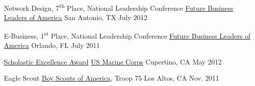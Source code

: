 \begin{cvhonors}
	
	\cvhonor
		{Network Design, 7\textsuperscript{th} Place, National Leadership Conference} %
		{\href{http://www.fbla-pbl.org/conferences/nlc/}{Future Business Leaders of America}} %
		{San Antonio, TX} %
		{July 2012} %
	
	\cvhonor
		{E-Business, 1\textsuperscript{st} Place, National Leadership Conference} %
		{\href{http://www.fbla-pbl.org/conferences/nlc/}{Future Business Leaders of America}} %
		{Orlando, FL} %
		{July 2011} %
	
	\cvhonor
		{\href{http://www.usmc.tripod.com/orl/HSAwardsProg.htm}{Scholastic Excellence Award}} %
		{\href{https://www.army.mil/}{US Marine Corps}} %
		{Cupertino, CA} %
		{May 2012} %
	
	\cvhonor
		{Eagle Scout} %
		{\href{https://www.scouting.org/resources/guide-to-advancement/eagle-scout-rank/}{Boy Scouts of America}, Troop 75} %
		{Los Altos, CA} %
		{Nov. 2011} %
	
\end{cvhonors}